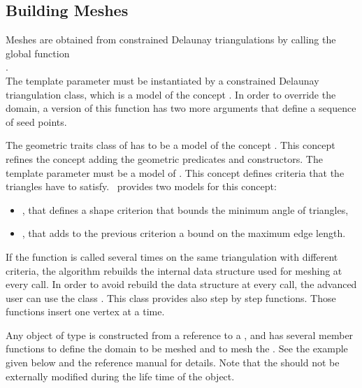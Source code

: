 \subsection{Building Meshes}
\label{sec:Mesh_2_building_meshes}

Meshes are obtained from
constrained Delaunay triangulations by calling the global function \\
. \\
The template parameter  must be instantiated by a constrained
Delaunay triangulation class, which is a model of the concept
. In order to override the domain,
a version of this function has two more arguments that define a sequence of
seed points.

The geometric traits class of  has to be a
model of the concept .  This concept
refines the concept 
adding the geometric predicates and constructors. The template parameter
 must be a model of . This concept
defines criteria that the triangles have to satisfy.
\cgal\ provides two models for this concept:
\begin{itemize}
\item {}, that defines a shape criterion
  that bounds the minimum angle of triangles, 
\item {}, that adds to the previous
criterion a bound on the maximum edge length.
\end{itemize}

If the function  is called several times on the
same triangulation with different criteria, the algorithm rebuilds the 
internal data structure used for meshing at every call. In order to avoid 
rebuild the data structure at every call, the advanced user can
use the class . This class provides also step
by step functions. Those functions insert one vertex at a time.

Any object of type  is constructed from a
reference to a , and has several member functions to define the
domain to be meshed and to mesh the . See the example given below
and the reference manual for details. Note that the  should not be
externally modified during the life time of the 
object.

